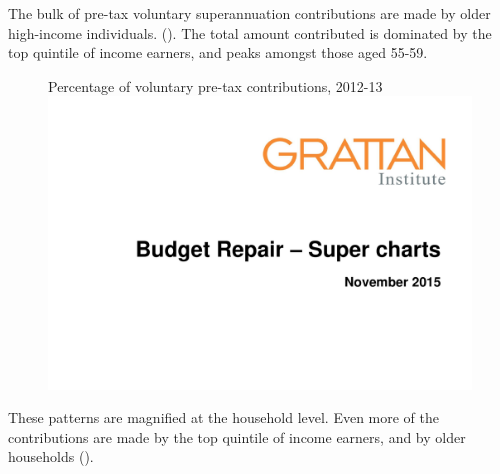 \begin{subappendices}
\begin{figure}
\end{figure}
The bulk of pre-tax voluntary superannuation contributions are made by older high-income individuals. (). The total amount contributed is dominated by the top quintile of income earners, and peaks amongst those aged 55-59.

\begin{figure}
%
{Percentage of voluntary pre-tax contributions, 2012-13}\label{fig:SUPER-A-2}
\includegraphics[width=\columnwidth,page=36]{super-atlas/PPTX.pdf}

\end{figure}

These patterns are magnified at the household level. Even more of the contributions are made by the top quintile of income earners, and by older households ().


\end{subappendices}
